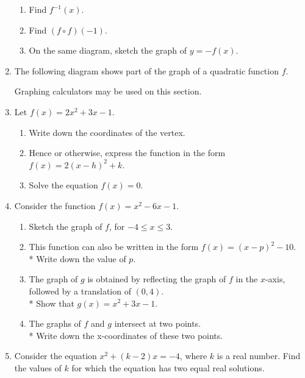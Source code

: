 \documentclass[12pt, twoside]{article}
\begin{document}
\begin{enumerate}
\begin{tikzpicture}[scale=1]
      \end{tikzpicture}
      \begin{enumerate}
        \item Find $f^{-1}(x)$.
        \item Find $(f \circ f)(-1)$.
        \item On the same diagram, sketch the graph of $y=-f(x)$.
      \end{enumerate}

    \item The following diagram shows part of the graph of a quadratic function $f$.

\newpage

    \newpage
    Graphing calculators may be used on this section.

    \item Let $f(x)=2x^2+3x-1$.
    \begin{enumerate}
        \item Write down the coordinates of the vertex.
        \item Hence or otherwise, express the function in the form $f(x)=2(x-h)^2 +k$.
        \item Solve the equation  $f(x)=0$.
    \end{enumerate}

    \item Consider the function $f(x)=x^2-6x-1$.
    \begin{enumerate}
        \item Sketch the graph of $f$, for $-4 \leq x \leq 3$.
        \item This function can also be written in the form $f(x)=(x-p)^2 -10$.\\*
        Write down the value of $p$.
        \item The graph of $g$ is obtained by reflecting the graph of $f$ in the $x$-axis, followed by a translation of $(0, 4)$.\\* Show that $g(x)=x^2+3x-1$.
        \item The graphs of $f$ and $g$ intersect at two points.\\*
        Write down the x-coordinates of these two points.
    \end{enumerate}

\newpage




\item Consider the equation $x^2 + (k-2)x=-4$, where $k$ is a real number. Find the values of $k$ for which the equation has two equal real solutions.


  \end{enumerate}
\end{document}
